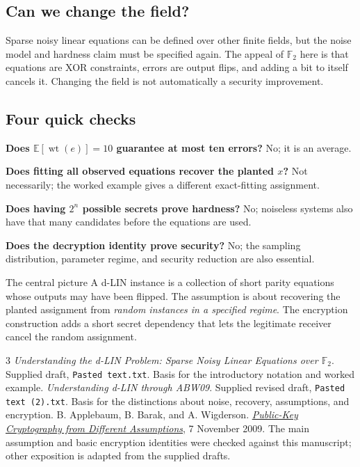 \documentclass[11pt,a4paper]{article}
\newcommand{\F}{\mathbb{F}}
\newcommand{\E}{\mathbb{E}}
\newcommand{\wt}{\operatorname{wt}}
\begin{document}
\subsection*{Can we change the field?}
Sparse noisy linear equations can be defined over other finite fields, but the noise model and hardness claim must be specified again. The appeal of $\F_2$ here is that equations are XOR constraints, errors are output flips, and adding a bit to itself cancels it. Changing the field is not automatically a security improvement.~\cite{draft1,draft2}

\subsection*{Four quick checks}
\textbf{Does $\E[\wt(e)]=10$ guarantee at most ten errors?} No; it is an average.

\textbf{Does fitting all observed equations recover the planted $x$?} Not necessarily; the worked example gives a different exact-fitting assignment.

\textbf{Does having $2^n$ possible secrets prove hardness?} No; noiseless systems also have that many candidates before the equations are used.

\textbf{Does the decryption identity prove security?} No; the sampling distribution, parameter regime, and security reduction are also essential.~\cite{draft2}

\begin{keyidea}{The central picture}
A d-LIN instance is a collection of short parity equations whose outputs may have been flipped. The assumption is about recovering the planted assignment from \emph{random instances in a specified regime}. The encryption construction adds a short secret dependency that lets the legitimate receiver cancel the random assignment.
\end{keyidea}

\vspace{-2pt}
\begingroup
\footnotesize
\setlength{\parskip}{2pt}
\renewcommand{\refname}{Sources}
\begin{thebibliography}{3}
\setlength{\itemsep}{2pt}
 \emph{Understanding the d-LIN Problem: Sparse Noisy Linear Equations over $\F_2$}. Supplied draft, \texttt{Pasted text.txt}. Basis for the introductory notation and worked example.
 \emph{Understanding d-LIN through ABW09}. Supplied revised draft, \texttt{Pasted text (2).txt}. Basis for the distinctions about noise, recovery, assumptions, and encryption.
 B. Applebaum, B. Barak, and A. Wigderson. \href{https://www.math.ias.edu/~avi/PUBLICATIONS/MYPAPERS/ABW09/ABW09.pdf}{\emph{Public-Key Cryptography from Different Assumptions}}, 7 November 2009. The main assumption and basic encryption identities were checked against this manuscript; other exposition is adapted from the supplied drafts.
\end{thebibliography}
\endgroup
\end{document}
